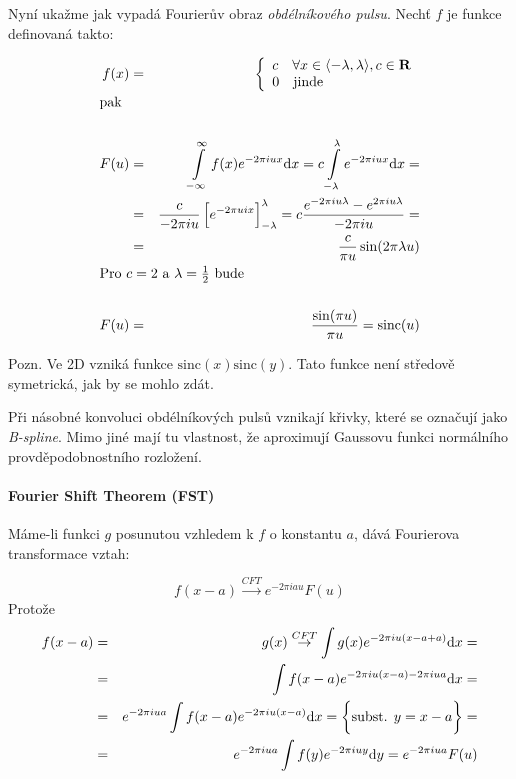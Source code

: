 Nyní ukažme jak vypadá Fourierův obraz {\em obdélníkového pulsu}. Nechť $f$ je funkce definovaná takto:

\begin{eqnarray}
f(x)&=&\left\{\begin{array}{ll}c\quad\forall x\in\langle-\lambda,\lambda\rangle,c\in \R\\
0\quad\hbox{jinde}\end{array}\right.\\
\noalign{\hbox{pak}\nonumber}\\
F(u)&=&\int\limits_{-\infty}^{\infty}f(x)e^{-2\pi iux}\d x=c\int\limits_{-\lambda}^\lambda e^{-2\pi i u x}\d x=\nonumber\\
&=&\frac{c}{-2\pi i u}\left[e^{-2\pi uix}\right]_{-\lambda}^\lambda=c\frac{e^{-2\pi iu\lambda}-e^{2\pi iu\lambda}}{-2\pi i u}=\nonumber\\
&=&\frac{c}{\pi u}\sin(2\pi\lambda u)\\
\noalign{\hbox{Pro $c=2$ a $\lambda=\frac{1}{2}$ bude\nonumber}}\\
F(u)&=&\frac{\sin(\pi u)}{\pi u}=\mathrm{sinc}(u)
\end{eqnarray}

Pozn. Ve 2D vzniká funkce $\mathrm{sinc}(x)\mathrm{sinc}(y)$. Tato funkce není středově symetrická, jak by se mohlo zdát.


Při násobné konvoluci obdélníkových pulsů vznikají křivky, které se označují jako {\em B-spline}. Mimo jiné mají tu
vlastnost, že aproximují Gaussovu funkci normálního provděpodobnostního rozložení.


\paragraph{Fourier Shift Theorem (FST)}  Máme-li funkci $g$ posunutou vzhledem k $f$ o konstantu $a$, dává Fourierova transformace vztah:

\begin{equation}
f(x-a)\stackrel{CFT}{\rightarrow} e^{-2\pi i a u} F(u)
\end{equation}
Protože
\begin{eqnarray}
f(x-a)&=&g(x)\stackrel{CFT}{\rightarrow}\int g(x)e^{-2\pi i u (x-a+a)}{\rm d} x=\nonumber\\
&=&\int f(x-a)e^{-2\pi i u (x-a)-2\pi i u a}{\rm d} x=\nonumber\\
&=&e^{-2\pi i u a}\int f(x-a)e^{-2\pi i u (x-a)}{\rm d} x=\bigg\{\hbox{subst. $y=x-a$}\bigg\}=\nonumber\\
&=&e^{-2\pi i u a}\int f(y)e^{-2\pi i u y}{\rm d} y=e^{-2\pi i u a}F(u)
\end{eqnarray}


